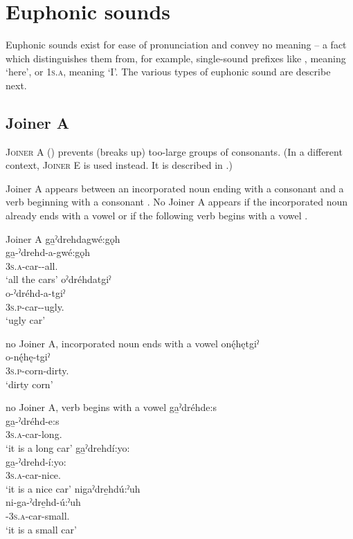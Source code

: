 \section{Euphonic sounds} \label{Euphonic sounds}
Euphonic sounds exist for ease of pronunciation and convey no meaning -- a fact which distinguishes them from, for example, single-sound prefixes like  {\cislocative}, meaning ‘here’, or  \textsc{1s.a}, meaning ‘I’. The various types of euphonic sound are describe next.

\subsection{Joiner A } \label{Joiner A}
\textsc{Joiner A} () prevents (breaks up) too-large groups of consonants. (In a different context, \textsc{Joiner E}  is used instead. It is described in .) 

Joiner A appears between an incorporated noun ending with a consonant and a verb beginning with a consonant . No Joiner A appears if the incorporated noun already ends with a vowel  or if the following verb begins with a vowel .

\ea\label{ex:epenvex} Joiner A
\ea ga̱ˀdrehdagwé:gǫh\\\label{ex:epenvexa}
\gll ga̱-ˀdrehd-a-gwé:gǫh\\
 \textsc{3s.a}-car-{\joinerA}-all.{\stative}\\
\glt `all the cars'
\ex oˀdréhdatgiˀ\\\label{ex:epenvexb}
\gll o-ˀdréhd-a-tgiˀ\\
\textsc{3s.p}-car-{\joinerA}-ugly.{\stative}\\
\glt `ugly car'
\z
\z

\ea\label{ex:epenvex2} no Joiner A, incorporated noun ends with a vowel
\ea onę́hętgiˀ\\\label{ex:epenvex2a}
\gll o-nę́hę-tgiˀ\\
\textsc{3s.p}-corn-dirty.{\stative}\\
\glt `dirty corn'
\z
\z

\ea\label{ex:epenvex3} no Joiner A, verb begins with a vowel
\ea ga̱ˀdréhde:s\\
\gll ga̱-ˀdréhd-e:s\\
 \textsc{3s.a}-car-long.{\stative}\\
\glt `it is a long car'
\ex ga̱ˀdrehdí:yo:\\
\gll ga̱-ˀdrehd-í:yo:\\
 \textsc{3s.a}-car-nice.{\stative}\\
\glt `it is a nice car'
\ex nigaˀdre̱hdú:ˀuh\\
\gll ni-ga-ˀdre̱hd-ú:ˀuh\\
 {\partitive}-\textsc{3s.a}-car-small.{\stative}\\
\glt `it is a small car'
\z
\z

